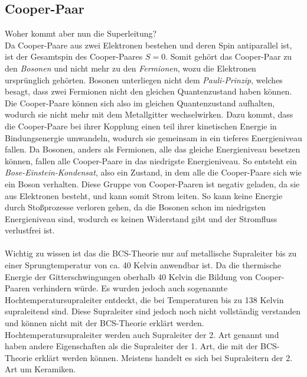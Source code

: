 \subsection{Cooper-Paar}
Woher kommt aber nun die Superleitung? \\
Da Cooper-Paare aus zwei Elektronen bestehen und deren Spin antiparallel ist, ist der Gesamtspin des Cooper-Paares $S=0$.
Somit gehört das Cooper-Paar zu den \textit{Bosonen} und nicht mehr zu den \textit{Fermionen}, wozu die Elektronen ursprünglich gehörten.
Bosonen unterliegen nicht dem \textit{Pauli-Prinzip}, welches besagt, dass zwei Fermionen nicht den gleichen Quantenzustand haben können.
Die Cooper-Paare können sich also im gleichen Quantenzustand aufhalten, wodurch sie nicht mehr mit dem Metallgitter wechselwirken.
Dazu kommt, dass die Cooper-Paare bei ihrer Kopplung einen teil ihrer kinetischen Energie in Bindungsenergie umwandeln, wodurch sie 
gemeinsam in ein tieferes Energieniveau fallen. Da Bosonen, anders als Fermionen, alle das gleiche Energieniveau besetzen können, 
fallen alle Cooper-Paare in das niedrigste Energieniveau. So entsteht ein \textit{Bose-Einstein-Kondensat}, also ein Zustand, in dem
alle die Cooper-Paare sich wie ein Boson verhalten. Diese Gruppe von Cooper-Paaren ist negativ geladen, da sie aus Elektronen besteht,
und kann somit Strom leiten. So kann keine Energie durch Stoßprozesse verloren gehen, da die Bosonen schon im niedrigsten Energieniveau sind, 
wodurch es keinen Widerstand gibt und der Stromfluss verlustfrei ist.\\
\\
Wichtig zu wissen ist das die BCS-Theorie nur auf metallische Supraleiter bis zu einer Sprungtemperatur von ca. 40 Kelvin anwendbar ist.
Da die thermische Energie der Gitterschwingungen oberhalb 40 Kelvin die Bildung von Cooper-Paaren verhindern würde. Es wurden jedoch auch
sogenannte Hochtemperatursupraleiter entdeckt, die bei Temperaturen bis zu 138 Kelvin supraleitend sind. Diese Supraleiter sind jedoch noch nicht
vollständig verstanden und können nicht mit der BCS-Theorie erklärt werden. Hochtemperatursupraleiter werden auch 
Supraleiter der 2. Art genannt und haben andere Eigenschaften als die Supraleiter der 1. Art, die mit der BCS-Theorie erklärt werden können.
Meistens handelt es sich bei Supraleitern der 2. Art um Keramiken.